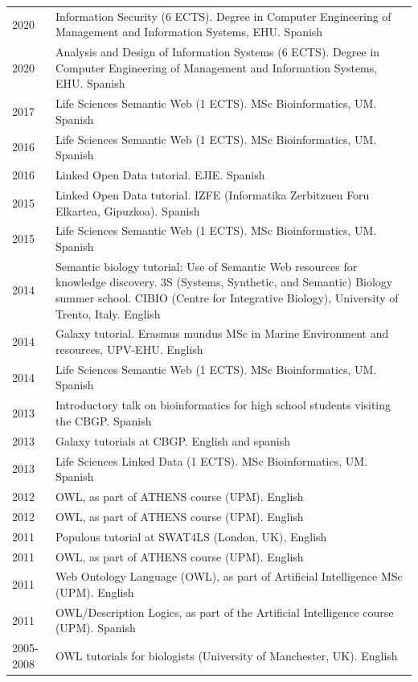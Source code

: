 \documentclass[11pt,fullpage]{article}
\begin{document}
\begin{longtable}{p{0.5in}|p{5.5in}}
2020 & Information Security (6 ECTS). Degree in Computer Engineering of Management and Information Systems, EHU. Spanish \\
2020 & Analysis and Design of Information Systems (6 ECTS). Degree in Computer Engineering of Management and Information Systems, EHU. Spanish \\
2017 & Life Sciences Semantic Web (1 ECTS). MSc Bioinformatics, UM. Spanish \\
2016 & Life Sciences Semantic Web (1 ECTS). MSc Bioinformatics, UM. Spanish \\
2016 & Linked Open Data tutorial. EJIE. Spanish \\
2015 & Linked Open Data tutorial. IZFE (Informatika Zerbitzuen Foru Elkartea, Gipuzkoa). Spanish \\
2015 & Life Sciences Semantic Web (1 ECTS). MSc Bioinformatics, UM. Spanish \\
2014 & Semantic biology tutorial: Use of Semantic Web resources for knowledge discovery. 3S (Systems, Synthetic, and Semantic) Biology summer school. CIBIO (Centre for Integrative Biology), University of Trento, Italy. English \\
2014 & Galaxy tutorial. Erasmus mundus MSc in Marine Environment and resources, UPV-EHU. English \\
2014 & Life Sciences Semantic Web (1 ECTS). MSc Bioinformatics, UM. Spanish \\ %
2013 & Introductory talk on bioinformatics for high school students visiting the CBGP. Spanish \\
2013 & Galaxy tutorials at CBGP. English and spanish \\ %
2013 & Life Sciences Linked Data (1 ECTS). MSc Bioinformatics, UM. Spanish \\
2012 & OWL, as part of ATHENS course (UPM). English \\
2012 & OWL, as part of ATHENS course (UPM). English \\
2011 & Populous tutorial at SWAT4LS (London, UK), English \\
2011 & OWL, as part of ATHENS course (UPM). English \\
2011 & Web Ontology Language (OWL), as part of Artificial Intelligence MSc (UPM). English \\ %
2011 & OWL/Description Logics, as part of the Artificial Intelligence course (UPM). Spanish \\ %
2005-2008 & OWL tutorials for biologists (University of Manchester, UK). English \\

\end{longtable}
\end{document}
